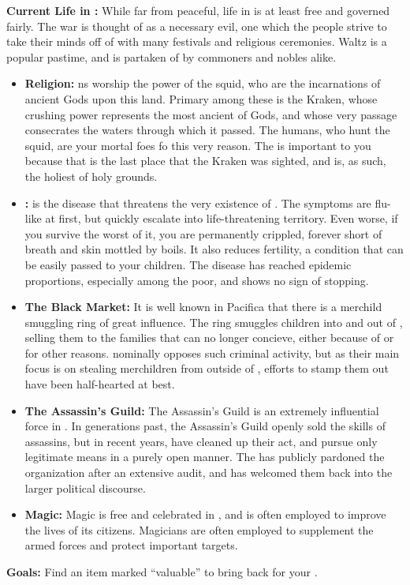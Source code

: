 \documentclass[blue]{NeptuneBall}
\begin{document}
{\bf Current Life in \pPacifica{}:}
While far from peaceful, life in \pPacifica{} is at least free and governed fairly. The war is thought of as a necessary evil, one which the people strive to take their minds off of with many festivals and religious ceremonies. Waltz is a popular pastime, and is partaken of by commoners and nobles alike.\\

\begin{itemize}
  \item {\bf Religion:} \pPacifica{}ns worship the power of the squid, who are the incarnations of ancient Gods upon this land. Primary among these is the Kraken, whose crushing power represents the most ancient of Gods, and whose very passage consecrates the waters through which it passed. The humans, who hunt the squid, are your mortal foes fo this very reason. The \pGazaStrip{} is important to you because that is the last place that the Kraken was sighted, and is, as such, the holiest of holy grounds.
  \item {\bf \cPolio{}:} \cPolio{} is the disease that threatens the very existence of \pPacifica{}. The symptoms are flu-like at first, but quickly escalate into life-threatening territory. Even worse, if you survive the worst of it, you are permanently crippled, forever short of breath and skin mottled by boils. It also reduces fertility, a condition that can be easily passed to your children. The disease has reached epidemic proportions, especially among the poor, and shows no sign of stopping. 
  \item {\bf The Black Market:} It is well known in Pacifica that there is a merchild smuggling ring of great influence. The ring smuggles children into and out of \pPacifica{}, selling them to the families that can no longer concieve, either because of \cPolio{} or for other reasons. \cPacificanRuler{\King} \cPacificanRuler{} nominally opposes such criminal activity, but as their main focus is on stealing merchildren from outside of \pPacifica{}, efforts to stamp them out have been half-hearted at best.
  \item {\bf The Assassin's Guild:} The Assassin's Guild is an extremely influential force in \pPacifica{}. In generations past, the Assassin's Guild openly sold the skills of assassins, but in recent years, have cleaned up their act, and pursue only legitimate means in a purely open manner. The \cPacificanRuler{\King} has publicly pardoned the organization after an extensive audit, and has welcomed them back into the larger political discourse.
  \item {\bf Magic:} Magic is free and celebrated in \pPacifica{}, and is often employed to improve the lives of its citizens. Magicians are often employed to supplement the armed forces and protect important targets.
\end{itemize}

{\bf Goals:} Find an item marked "`valuable"' to bring back for your \cPacificanRuler{\King}.
\end{document}

